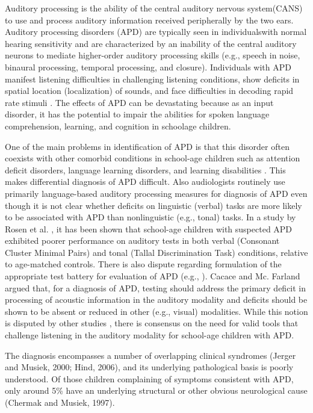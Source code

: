 \documentclass[letterpaper%
, twoside%
, 12pt%
,these%
, english%
,creativecommons,hyperref%
]{thETS}
\begin{document}
\begin{introduction}
Auditory processing is the ability of the central auditory nervous
system(CANS) to use and process auditory information
received peripherally by the two ears. Auditory processing
disorders (APD) are typically seen in individualswith normal
hearing sensitivity and are characterized by an inability of the
central auditory neurons to mediate higher-order auditory
processing skills (e.g., speech in noise, binaural processing,
temporal processing, and closure). Individuals with APD
manifest listening difficulties in challenging listening conditions,
show deficits in spatial location (localization) of
sounds, and face difficulties in decoding rapid rate stimuli \cite{American}.
The effects of APD can be devastating because as an input
disorder, it has the potential to impair the abilities for spoken
language comprehension, learning, and cognition in schoolage
children.
\par One of the main problems in identification of APD is that
this disorder often coexists with other comorbid conditions
in school-age children such as attention deficit disorders,
language learning disorders, and learning disabilities \cite{Jerger}.
This makes differential diagnosis of APD difficult. Also
audiologists routinely use primarily language-based auditory
processing measures for diagnosis of APD even though it
is not clear whether deficits on linguistic (verbal) tasks are
more likely to be associated with APD than nonlinguistic
(e.g., tonal) tasks. In a study by Rosen et al. \cite{Rosen}, it has
been shown that school-age children with suspected APD
exhibited poorer performance on auditory tests in both
verbal (Consonant Cluster Minimal Pairs) and tonal (Tallal
Discrimination Task) conditions, relative to age-matched
controls. There is also dispute regarding formulation of the
appropriate test battery for evaluation of APD (e.g., \cite{Cacacea}).
Cacace and Mc. Farland \cite{Cacaceb} argued that, for a diagnosis of
APD, testing should address the primary deficit in processing
of acoustic information in the auditory modality and deficits
should be shown to be absent or reduced in other (e.g., visual)
modalities. While this notion is disputed by other studies
\cite{Musiek, Moore}, there is consensus on the need for valid tools that
challenge listening in the auditory modality for school-age
children with APD.


The diagnosis encompasses a number of overlapping clinical syndromes (Jerger and Musiek, 2000; Hind, 2006), and its underlying pathological basis is poorly understood. Of those children complaining of symptoms consistent with APD, only around 5\% have an underlying structural or other obvious neurological cause (Chermak and Musiek, 1997).


\end{introduction}
\end{document}

